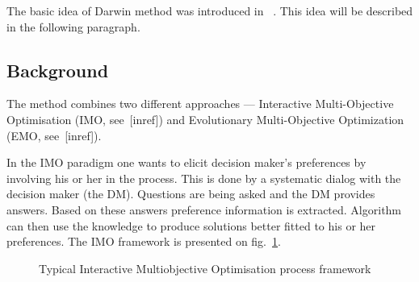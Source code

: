 The basic idea of Darwin method was introduced in~ \cite{GMS09}. This idea will
be described in the following paragraph.

\subsection{Background}

The method combines two different approaches --- Interactive Multi-Objective
Optimisation (IMO, see~[inref]) and Evolutionary Multi-Objective Optimization
(EMO, see~[inref]).

In the IMO paradigm one wants to elicit decision maker's preferences by
involving his or her in the process. This is done by a systematic dialog with
the decision maker (the DM). Questions are being asked and the DM provides
answers. Based on these answers preference information is extracted. Algorithm
can then use the knowledge to produce solutions better fitted to his or her
preferences. The IMO framework is presented on
fig.~\ref{fig:interactive-process}.

\begin{figure} 
  \begin{center}
    \caption{Typical Interactive Multiobjective
      Optimisation process framework\label{fig:interactive-process}}
  \end{center} 
\end{figure} 


